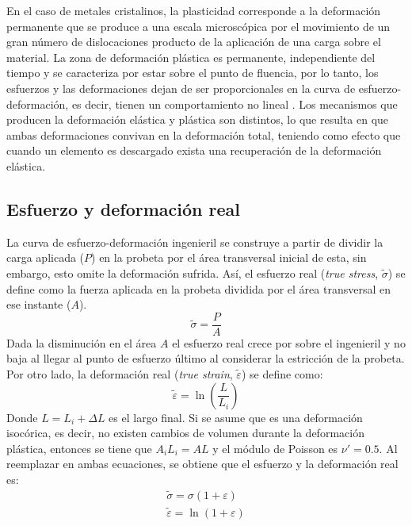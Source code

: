 En el caso de metales cristalinos, la plasticidad corresponde a la deformación permanente que se produce a una escala microscópica por el movimiento de un gran número de dislocaciones producto de la aplicación de una carga sobre el material. La zona de deformación plástica es permanente, independiente del tiempo y se caracteriza por estar sobre el punto de fluencia, por lo tanto, los esfuerzos y las deformaciones dejan de ser proporcionales en la curva de esfuerzo-deformación, es decir, tienen un comportamiento no lineal . Los mecanismos que producen la deformación elástica y plástica son distintos, lo que resulta en que ambas deformaciones convivan en la deformación total, teniendo como efecto que cuando un elemento es descargado exista una recuperación de la deformación elástica. 


\subsection{Esfuerzo y deformación real}
La curva de esfuerzo-deformación ingenieril se construye a partir de dividir la carga aplicada ($P$) en la probeta por el área transversal inicial de esta, sin embargo, esto omite la deformación sufrida. Así, el esfuerzo real (\textit{true stress}, $\tilde{\sigma}$) se define como la fuerza aplicada en la probeta dividida por el área transversal en ese instante ($A$). 
\begin{equation}
	\tilde{\sigma} = \frac{P}{A}
\end{equation} 
Dada la disminución en el área $A$ el esfuerzo real crece por sobre el ingenieril y no baja al llegar al punto de esfuerzo último al considerar la estricción de la probeta. Por otro lado, la deformación real (\textit{true strain}, $\tilde{\varepsilon}$) se define como:
\begin{equation}
	\tilde{\varepsilon} = \ln\left(\frac{L}{L_i}\right)
\end{equation}
Donde $L=L_i + \Delta L$ es el largo final. Si se asume que es una deformación isocórica, es decir, no existen cambios de volumen durante la deformación plástica, entonces se tiene que $A_iL_i = AL$ y el módulo de Poisson es $\nu' = 0.5$. Al reemplazar en ambas ecuaciones, se obtiene que el esfuerzo y la deformación real es:
\begin{gather}
	\tilde{\sigma} = \sigma(1 + \varepsilon) \label{eq:true_esf}\\
	\tilde{\varepsilon} = \ln (1 + \varepsilon) \label{eq:true_strain}
\end{gather}

